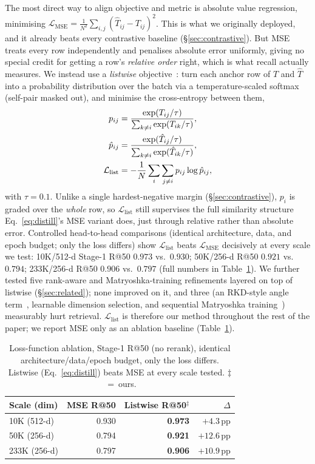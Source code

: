 \documentclass[sigconf]{acmart}
\begin{document}
The most direct way to align objective and metric is absolute value regression,
minimising $\mathcal{L}_{\mathrm{MSE}}=\frac{1}{N^2}\sum_{i,j}(\hat T_{ij}-T_{ij})^2$.
This is what we originally deployed, and it already beats every contrastive
baseline (\S\ref{sec:contrastive}). But MSE treats every row independently and
penalises absolute error uniformly, giving no special credit for getting a row's
\emph{relative order} right, which is what recall actually measures. We instead
use a \emph{listwise} objective~\cite{cao07}: turn each anchor row of $T$ and
$\hat T$ into a probability distribution over the batch via a temperature-scaled
softmax (self-pair masked out), and minimise the cross-entropy between them,
\begin{align}
  p_{ij}&=\frac{\exp(T_{ij}/\tau)}{\sum_{k\neq i}\exp(T_{ik}/\tau)},\notag\\
  \hat p_{ij}&=\frac{\exp(\hat T_{ij}/\tau)}{\sum_{k\neq i}\exp(\hat T_{ik}/\tau)},\notag\\
  \mathcal{L}_{\mathrm{list}}&=-\frac{1}{N}\sum_i\sum_{j\neq i} p_{ij}\log\hat p_{ij},
  \label{eq:distill}
\end{align}
with $\tau=0.1$. Unlike a single hardest-negative margin (\S\ref{sec:contrastive}),
$p_i$ is graded over the \emph{whole} row, so $\mathcal{L}_{\mathrm{list}}$ still
supervises the full similarity structure Eq.~\eqref{eq:distill}'s MSE variant
does, just through relative rather than absolute error. Controlled head-to-head
comparisons (identical architecture, data, and epoch budget; only the loss
differs) show $\mathcal{L}_{\mathrm{list}}$ beats $\mathcal{L}_{\mathrm{MSE}}$
decisively at every scale we test: 10K/512-d Stage-1 R@50 $0.973$ vs.\ $0.930$;
50K/256-d R@50 $0.921$ vs.\ $0.794$; 233K/256-d R@50 $0.906$ vs.\ $0.797$ (full
numbers in Table~\ref{tab:lossablation}). We further tested five rank-aware and
Matryoshka-training refinements layered on top of listwise
(\S\ref{sec:related}); none improved on it, and three (an RKD-style angle
term~\cite{park19rkd}, learnable dimension selection, and sequential Matryoshka
training~\cite{smec25}) measurably hurt retrieval. $\mathcal{L}_{\mathrm{list}}$
is therefore our method throughout the rest of the paper; we report MSE only as
an ablation baseline (Table~\ref{tab:lossablation}).

\begin{table}[t]\centering
\caption{Loss-function ablation, Stage-1 R@50 (no rerank), identical
architecture/data/epoch budget, only the loss differs. Listwise
(Eq.~\ref{eq:distill}) beats MSE at every scale tested. $\ddagger$~=~ours.}
\label{tab:lossablation}\small\setlength{\tabcolsep}{5pt}
\begin{tabular}{@{}lrrr@{}}
\toprule
Scale (dim) & MSE R@50 & Listwise R@50$^\ddagger$ & $\Delta$ \\
\midrule
10K (512-d)  & 0.930 & \textbf{0.973} & $+4.3$\,pp \\
50K (256-d)  & 0.794 & \textbf{0.921} & $+12.6$\,pp \\
233K (256-d) & 0.797 & \textbf{0.906} & $+10.9$\,pp \\
\bottomrule
\end{tabular}
\end{table}
\end{document}
